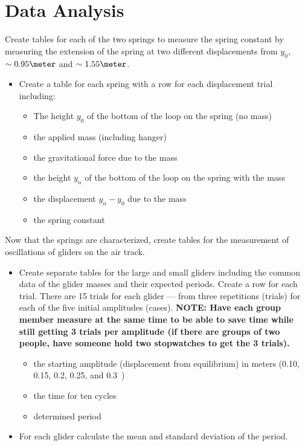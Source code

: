 \section{Data Analysis}
Create tables for each of the two springs to measure the spring constant by measuring the extension of the spring at two different displacements from $y_0$, $\sim 0.95 \meter$ and $\sim 1.55 \meter$.
\begin{itemize}
\item Create a table for each spring with a row for each displacement trial including:
  \begin{itemize}
  \item The height $y_0$ of the bottom of the loop on the spring (no mass)
  \item the applied mass (including hanger)
  \item the gravitational force due to the mass
  \item the height $y_n$ of the bottom of the loop on the spring with the mass
  \item the displacement $y_n-y_0$ due to the mass
  \item the spring constant
  \end{itemize}
\end{itemize}

Now that the springs are characterized, create tables for the measurement of oscillations of gliders on the air track.
\begin{itemize}
\item Create separate tables for the large and small gliders including the common data of the glider masses and their expected periods. Create a row for each trial. There are 15 trials for each glider --- from three repetitions (trials) for each of the five initial amplitudes (cases). \textbf{NOTE: Have each group member measure at the same time to be able to save time while still getting 3 trials per amplitude (if there are groups of two people, have someone hold two stopwatches to get the 3 trials).}
  \begin{itemize}
  \item the starting amplitude (displacement from equilibrium) in meters (0.10, 0.15, 0.2, 0.25, and 0.3~\meter)
  \item the time for ten cycles
  \item determined period
  \end{itemize}
\item For each glider calculate the mean and standard deviation of the period.
\end{itemize}

